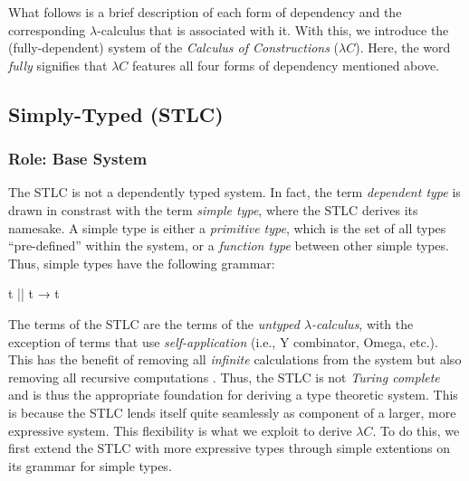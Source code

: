 \documentclass[12pt]{article}
\begin{document}
What follows is a brief description of each form of dependency and the
corresponding \(\lambda\)-calculus that is associated with it. With this, we
introduce the (fully-dependent) system of the \textit{Calculus of Constructions}
(\(\lambda C\)). Here, the word \textit{fully} signifies that \(\lambda C\)
features all four forms of dependency mentioned above.

\subsection*{Simply-Typed (STLC)}
\subsubsection*{Role: Base System}
The STLC is not a dependently typed system. In fact, the term {\em dependent type}
is drawn in constrast with the term {\em simple type}, where the STLC derives
its namesake. A simple type is either a {\em primitive type}, which is the set
of all types ``pre-defined'' within the system, or a {\em function type} between
other simple types. Thus, simple types have the following grammar:
\begin{center}
\begin{minipage}{0.5\textwidth}
\begin{code}
t || t → t
\end{code}
\end{minipage}
\end{center}
The terms of the STLC are the terms of the \textit{untyped \(\lambda\)-calculus},
with the exception of terms that use \textit{self-application} (i.e., Y
combinator, Omega, etc.). This has the benefit of removing all \textit{infinite}
calculations from the system but also removing all recursive computations \cite{}.
Thus, the STLC is not \textit{Turing complete} and is thus the appropriate
foundation for deriving a type theoretic system. This is because the STLC lends
itself quite seamlessly as component of a larger, more expressive system. This
flexibility is what we exploit to derive \(\lambda C\). To do this, we first
extend the STLC with more expressive types through simple extentions on its
grammar for simple types.

\end{document}
